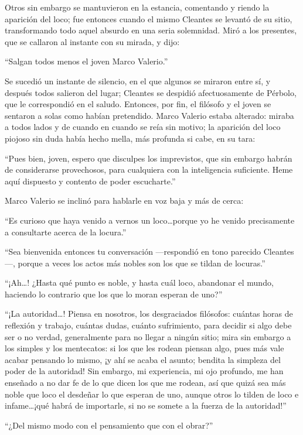 \documentclass[11pt,openany]{book}
\begin{document}
Otros sin embargo se mantuvieron en la estancia, comentando y riendo la aparición del loco; fue entonces cuando el mismo Cleantes se levantó de su sitio, transformando todo aquel absurdo en una seria solemnidad. Miró a los presentes, que se callaron al instante con su mirada, y dijo: 

“Salgan todos menos el joven Marco Valerio.” 

Se sucedió un instante de silencio, en el que algunos se miraron entre sí, y después todos salieron del lugar; Cleantes se despidió afectuosamente de Pérbolo, que le correspondió en el saludo. Entonces, por fin, el filósofo y el joven se sentaron a solas como habían pretendido. Marco Valerio estaba alterado: miraba a todos lados y de cuando en cuando se reía sin motivo; la aparición del loco piojoso sin duda había hecho mella, más profunda si cabe, en su tara: 

“Pues bien, joven, espero que disculpes los imprevistos, que sin embargo habrán de considerarse provechosos, para cualquiera con la inteligencia suficiente. Heme aquí dispuesto y contento de poder escucharte.” 

Marco Valerio se inclinó para hablarle en voz baja y más de cerca: 

“Es curioso que haya venido a vernos un loco\dots porque yo he venido precisamente a consultarte acerca de la locura.” 

“Sea bienvenida entonces tu conversación —respondió en tono parecido Cleantes—, porque a veces los actos más nobles son los que se tildan de locuras.” 

“¡Ah\dots! ¿Hasta qué punto es noble, y hasta cuál loco, abandonar el mundo, haciendo lo contrario que los que lo moran esperan de uno?” 

“¡La autoridad\dots! Piensa en nosotros, los desgraciados filósofos: cuántas horas de reflexión y trabajo, cuántas dudas, cuánto sufrimiento, para decidir si algo debe ser o no verdad, generalmente para no llegar a ningún sitio; mira sin embargo a los simples y los mentecatos: si los que les rodean piensan algo, pues más vale acabar pensando lo mismo, ¡y ahí se acaba el asunto; bendita la simpleza del poder de la autoridad! Sin embargo, mi experiencia, mi ojo profundo, me han enseñado a no dar fe de lo que dicen los que me rodean, así que quizá sea más noble que loco el desdeñar lo que esperan de uno, aunque otros lo tilden de loco e infame\dots ¡qué habrá de importarle, si no se somete a la fuerza de la autoridad!” 

“¿Del mismo modo con el pensamiento que con el obrar?” 
\end{document}

